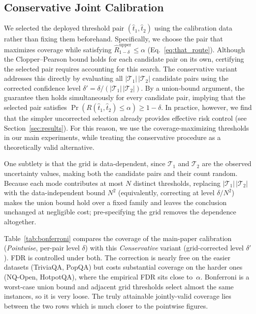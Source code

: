 \subsection{Conservative Joint Calibration}
\label{app:bonferroni}
We selected the deployed threshold pair $(\hat{t}_1, \hat{t}_2)$ using the calibration data rather than fixing them beforehand. Specifically, we choose the pair that maximizes coverage while satisfying $\hat{R}^{\mathrm{upper}}_{1-\delta} \leq \alpha$ (Eq.~\ref{eq:that_route}). Although the Clopper--Pearson bound holds for each candidate pair on its own, certifying the selected pair requires accounting for this search. The conservative variant addresses this directly by evaluating all $|\mathcal{T}_1|\,|\mathcal{T}_2|$ candidate pairs using the corrected confidence level $\delta'=\delta/(|\mathcal{T}_1|\,|\mathcal{T}_2|)$. By a union-bound argument, the guarantee then holds simultaneously for every candidate pair, implying that the selected pair satisfies $\Pr(R(\hat{t}_1,\hat{t}_2)\leq\alpha)\geq1-\delta$. In practice, however, we find that the simpler uncorrected selection already provides effective risk control (see Section~\ref{sec:results}). For this reason, we use the coverage-maximizing thresholds in our main experiments, while treating the conservative procedure as a theoretically valid alternative.

One subtlety is that the grid is data-dependent, since $\mathcal{T}_1$ and $\mathcal{T}_2$ are the observed uncertainty values, making both the candidate pairs and their count random. Because each mode contributes at most $N$ distinct thresholds, replacing $|\mathcal{T}_1|\,|\mathcal{T}_2|$ with the data-independent bound $N^2$ (equivalently, correcting at level $\delta/N^2$) makes the union bound hold over a fixed family and leaves the conclusion unchanged at negligible cost; pre-specifying the grid removes the dependence altogether.

Table~\ref{tab:bonferroni} compares the coverage of the main-paper calibration (\emph{Pointwise}, per-pair level $\delta$) with this \emph{Conservative} variant (grid-corrected level $\delta'$). FDR is controlled under both. The correction is nearly free on the easier datasets (TriviaQA, PopQA) but costs substantial coverage on the harder ones (NQ-Open, HotpotQA), where the empirical FDR sits close to~$\alpha$. Bonferroni is a worst-case union bound and adjacent grid thresholds select almost the same instances, so it is very loose. The truly attainable jointly-valid coverage lies between the two rows which is much closer to the pointwise figures.

